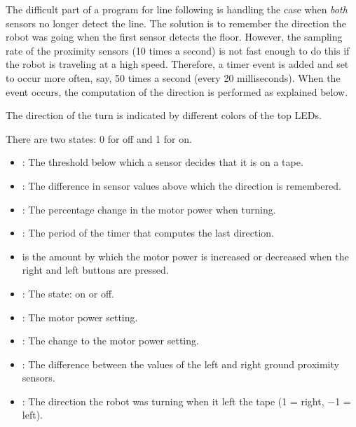 The difficult part of a program for line following is handling the case
when \emph{both} sensors no longer detect the line. The solution is to
remember the direction the robot was going when the first sensor detects
the floor. However, the sampling rate of the proximity sensors (10 times
a second) is not fast enough to do this if the robot is traveling at a
high speed. Therefore, a timer event is added and set to occur more
often, say, 50 times a second (every 20 milliseconds). When the event
occurs, the computation of the direction is performed as explained
below.

The direction of the turn is indicated by different colors of the top
LEDs.


There are two states: 0 for off and 1 for on.


\begin{itemize}
\item {}: The threshold below which a sensor decides that it
is on a tape.

\item {}: The difference in sensor values above which
the direction is remembered.

\item {}: The percentage change in the motor power when
turning.

\item {}: The period of the timer that computes the last
direction.

\item {} is the amount by which the motor power is increased
or decreased when the right and left buttons are pressed.
\end{itemize}


\begin{itemize}
\item {}: The state: on or off. 
\item {}: The motor power setting.
\item {}: The change to the motor power setting.
\item {}: The difference between the values of the left and right
ground proximity sensors. 
\item {}: The direction the robot was turning when it left the tape
(1 = right, $-$1 = left).
\end{itemize}

